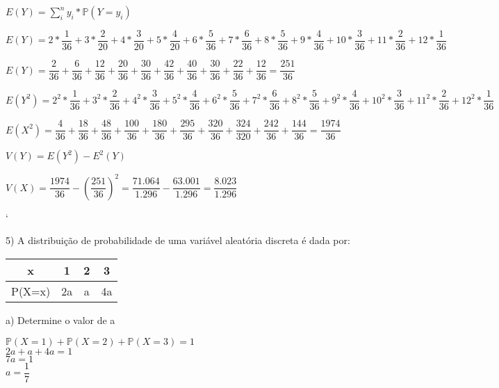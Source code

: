 \documentclass[12pt,a4paper]{article}
\begin{document}
\begin{center}
	\vspace{1.5cm}
	$E(Y) = \sum_{i}^{n} y_{i}*\mathbb{P}(Y = y_{i})$
	
	\vspace{1cm}
	$E(Y) = 2*\dfrac{1}{36}+3*\dfrac{2}{20}+4*\dfrac{3}{20} + 5*\dfrac{4}{20} + 6*\dfrac{5}{36} + 7*\dfrac{6}{36} + 8*\dfrac{5}{36} + 9*\dfrac{4}{36} + 10*\dfrac{3}{36} + 11*\dfrac{2}{36} + 12*\dfrac{1}{36}$
	
	\vspace{0.25cm}
	$E(Y) = \dfrac{2}{36} + \dfrac{6}{36} + \dfrac{12}{36} + \dfrac{20}{36} + \dfrac{30}{36} + \dfrac{42}{36} + \dfrac{40}{36} + \dfrac{30}{36} + \dfrac{22}{36}  + \dfrac{12}{36} = \dfrac{251}{36}$
	
	\vspace{1cm}
	$E(Y^{2}) = 2^{2}*\dfrac{1}{36}+3^{2}*\dfrac{2}{36}+4^{2}*\dfrac{3}{36} + 5^{2}*\dfrac{4}{36} + 6^{2}*\dfrac{5}{36} + 7^{2}*\dfrac{6}{36} + 8^{2}*\dfrac{5}{36} + 9^{2}*\dfrac{4}{36} + 10^{2}*\dfrac{3}{36}+ 11^{2}*\dfrac{2}{36}+12^{2}*\dfrac{1}{36}$
	
	\vspace{0.25cm}
	$ E (X^{2})= \dfrac{4}{36} + \dfrac{18}{36} + \dfrac{48}{36} + \dfrac{100}{36} + \dfrac{180}{36} + \dfrac{295}{36} + \dfrac{320}{36} + \dfrac{324}{320} + \dfrac{242}{36} + \dfrac{144}{36}= \dfrac{1974}{36}$
	
	\vspace{1cm}
	$V(Y) = E(Y^{2}) - E^{2}(Y)$
	
	\vspace{1cm}
	$V(X) = \dfrac{1974}{36}-\left(\dfrac{251}{36}\right)^{2} = \dfrac{71.064}{1.296}-\dfrac{63.001}{1.296} = \dfrac{8.023}{1.296}$
\end{center}`

\vspace{1cm}
5) A distribuição de probabilidade de uma variável aleatória discreta é dada por:

\begin{table}[h]
\centering
\begin{tabular}{|c|c|c|c|}\hline
x & 1 & 2 & 3\\\hline
P(X=x) & 2a & a & 4a\\\hline
\end{tabular}
\end{table}

a) Determine o valor de a

\begin{center}
	\vspace{0.25cm}
	$\mathbb{P}(X=1) + \mathbb{P}(X=2)+ \mathbb{P}(X=3) = 1$
	\vspace{0.25cm}\\
	$2a+a+4a = 1$
	\vspace{0.25cm}\\
	$7a = 1$
	\vspace{0.25cm}\\
	$a= \dfrac{1}{7}$
\end{center}
\end{document}

